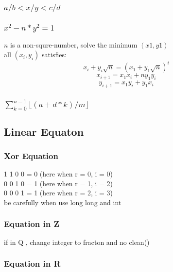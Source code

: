 \documentclass[a4paper,5pt,twocolumn,titlepage]{article}
\begin{document}
\begin{CJK*}{GBK}{song}
        \subsubsection{$a/b < x/y < c/d$}
         
         \subsubsection{$x^2 - n*y^2 = 1$}
         $n$ is a non-squre-number, solve the minimum $(x1,y1)$\\
         all $(x_i,y_i)$ satisfies:
         $$x_i + y_i\sqrt n = (x_1 + y_1\sqrt n)^i$$
         $$x_{i+1} = x_1x_i + ny_1y_i$$
         $$y_{i+1} = x_1y_i + y_1x_i$$
         
         \subsubsection{$\sum_{k=0}^{n-1}\lfloor (a+d*k)/m \rfloor$}
         
    \subsection{Linear Equaton}
        \subsubsection{Xor Equation}
             1 1 0 0 = 0 (here when r = 0, i = 0)\\
             0 0 1 0 = 1 (here when r = 1, i = 2)\\
             0 0 0 1 = 1 (here when r = 2, i = 3)\\
            
            be carefully when use long long and int
            
        \subsubsection{Equation in Z}
        if in Q , change integer to fracton and no clean()
            
        \subsubsection{Equation in R}
            

\end{CJK*}
\end{document}
